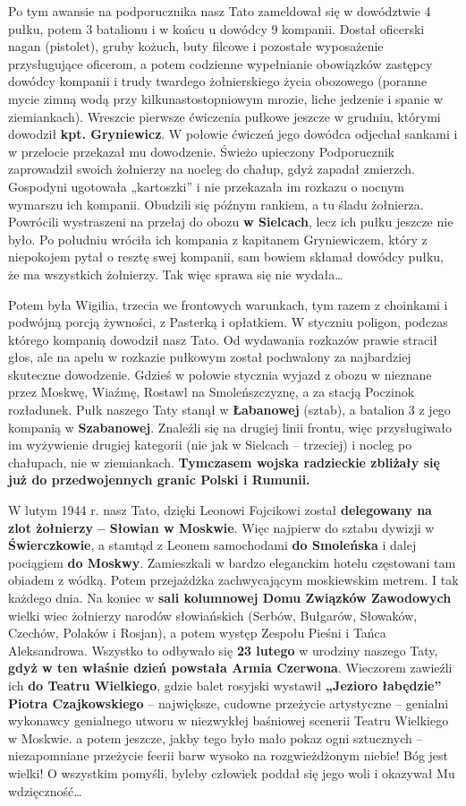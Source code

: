 Po tym awansie na podporucznika nasz Tato zameldował się w dowództwie 4 pułku, potem 3 batalionu i w końcu u dowódcy 9 kompanii. Dostał oficerski nagan (pistolet), gruby kożuch, buty filcowe i pozostałe wyposażenie przysługujące oficerom, a potem codzienne wypełnianie obowiązków zastępcy dowódcy kompanii i trudy twardego żołnierskiego życia obozowego (poranne mycie zimną wodą przy kilkunastostopniowym mrozie, liche jedzenie i spanie w ziemiankach). Wreszcie pierwsze ćwiczenia pułkowe jeszcze w grudniu, którymi dowodził \textbf{kpt. Gryniewicz}. W połowie ćwiczeń jego dowódca odjechał sankami i w przelocie przekazał mu dowodzenie. Świeżo upieczony Podporucznik zaprowadził swoich żołnierzy na nocleg do chałup, gdyż zapadał zmierzch. Gospodyni ugotowała „kartoszki” i nie przekazała im rozkazu o nocnym wymarszu ich kompanii. Obudzili się późnym rankiem, a tu śladu żołnierza. Powrócili wystraszeni na przełaj do obozu \textbf{w Sielcach}, lecz ich pułku jeszcze nie było. Po południu wróciła ich kompania z kapitanem Gryniewiczem, który z niepokojem pytał o resztę swej kompanii, sam bowiem skłamał dowódcy pułku, że ma wszystkich żołnierzy. Tak więc sprawa się nie wydała…

Potem była Wigilia, trzecia we frontowych warunkach, tym razem z choinkami i podwójną porcją żywności, z Pasterką i opłatkiem. W styczniu poligon, podczas którego kompanią dowodził nasz Tato. Od wydawania rozkazów prawie stracił głos, ale na apelu w rozkazie pułkowym został pochwalony za najbardziej skuteczne dowodzenie. Gdzieś w połowie stycznia wyjazd z obozu w nieznane przez Moskwę, Wiaźmę, Rostawl na Smoleńszczyznę, a za stacją Poczinok rozładunek. Pułk naszego Taty stanął w \textbf{Łabanowej} (sztab), a batalion 3 z jego kompanią w \textbf{Szabanowej}. Znaleźli się na drugiej linii frontu, więc przysługiwało im wyżywienie drugiej kategorii (nie jak w Sielcach -- trzeciej) i nocleg po chałupach, nie w ziemiankach. \textbf{Tymczasem wojska radzieckie zbliżały się już do przedwojennych granic Polski i Rumunii.}

W lutym 1944 r. nasz Tato, dzięki Leonowi Fojcikowi został \textbf{delegowany na zlot żołnierzy -- Słowian w Moskwie}. Więc najpierw do sztabu dywizji w \textbf{Świerczkowie}, a stamtąd z Leonem samochodami \textbf{do Smoleńska} i dalej pociągiem \textbf{do Moskwy}. Zamieszkali w bardzo eleganckim hotelu częstowani tam obiadem z wódką. Potem przejażdżka zachwycającym moskiewskim metrem. I tak każdego dnia. Na koniec w \textbf{sali kolumnowej Domu Związków Zawodowych} wielki wiec żołnierzy narodów słowiańskich (Serbów, Bułgarów, Słowaków, Czechów, Polaków i Rosjan), a potem występ Zespołu Pieśni i Tańca Aleksandrowa. Wszystko to odbywało się \textbf{23 lutego} w urodziny naszego Taty, \textbf{gdyż w ten właśnie dzień powstała Armia Czerwona}. Wieczorem zawieźli ich \textbf{do Teatru Wielkiego}, gdzie balet rosyjski wystawił \textbf{„Jezioro łabędzie” Piotra Czajkowskiego} -- największe, cudowne przeżycie artystyczne -- genialni wykonawcy genialnego utworu w niezwykłej baśniowej scenerii Teatru Wielkiego w Moskwie. a potem jeszcze, jakby tego było mało pokaz ogni sztucznych – niezapomniane przeżycie feerii barw wysoko na rozgwieżdżonym niebie! Bóg jest wielki! O wszystkim pomyśli, byleby człowiek poddał się jego woli i okazywał Mu wdzięczność…

